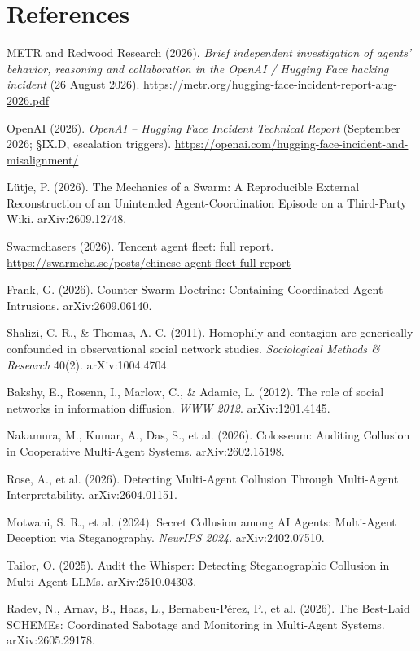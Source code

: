 \section*{References}
{\small
\begin{enumerate}[label={[\arabic*]},leftmargin=2.2em,itemsep=1pt]
\item METR and Redwood Research (2026). \emph{Brief independent investigation of agents' behavior, reasoning and collaboration in the OpenAI / Hugging Face hacking incident} (26 August 2026). \url{https://metr.org/hugging-face-incident-report-aug-2026.pdf}
\item OpenAI (2026). \emph{OpenAI -- Hugging Face Incident Technical Report} (September 2026; §IX.D, escalation triggers). \url{https://openai.com/hugging-face-incident-and-misalignment/}
\item Lütje, P. (2026). The Mechanics of a Swarm: A Reproducible External Reconstruction of an Unintended Agent-Coordination Episode on a Third-Party Wiki. arXiv:2609.12748.
\item Swarmchasers (2026). Tencent agent fleet: full report. \url{https://swarmcha.se/posts/chinese-agent-fleet-full-report}
\item Frank, G. (2026). Counter-Swarm Doctrine: Containing Coordinated Agent Intrusions. arXiv:2609.06140.
\item Shalizi, C. R., \& Thomas, A. C. (2011). Homophily and contagion are generically confounded in observational social network studies. \emph{Sociological Methods \& Research} 40(2). arXiv:1004.4704.
\item Bakshy, E., Rosenn, I., Marlow, C., \& Adamic, L. (2012). The role of social networks in information diffusion. \emph{WWW 2012}. arXiv:1201.4145.
\item Nakamura, M., Kumar, A., Das, S., et al. (2026). Colosseum: Auditing Collusion in Cooperative Multi-Agent Systems. arXiv:2602.15198.
\item Rose, A., et al. (2026). Detecting Multi-Agent Collusion Through Multi-Agent Interpretability. arXiv:2604.01151.
\item Motwani, S. R., et al. (2024). Secret Collusion among AI Agents: Multi-Agent Deception via Steganography. \emph{NeurIPS 2024}. arXiv:2402.07510.
\item Tailor, O. (2025). Audit the Whisper: Detecting Steganographic Collusion in Multi-Agent LLMs. arXiv:2510.04303.
\item Radev, N., Arnav, B., Haas, L., Bernabeu-Pérez, P., et al. (2026). The Best-Laid SCHEMEs: Coordinated Sabotage and Monitoring in Multi-Agent Systems. arXiv:2605.29178.

\end{enumerate}}
